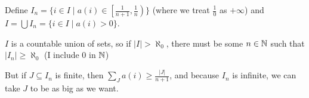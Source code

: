 \begin{cExercise}
	Define $I_n=\{i\in I\mid a(i)\in \left[\frac1{n+1},\frac1{n}\right)\}$ (where we treat $\frac10$ as $+\infty$) and $I=\bigcup I_n=\{i\in I\mid a(i)>0\}$.
	
	$I$ is a countable union of sets, so if $|I|>\aleph_0$, there must be some $n\in\mathbb N$ such that $|I_n|\ge \aleph_0$ (I include $0$ in $\mathbb N$)
	
	But if $J\subseteq I_n$ is finite, then $\sum_J a(i)\ge \frac{|J|}{n+1}$, and because $I_n$ is infinite, we can take $J$ to be as big as we want.
\end{cExercise}






